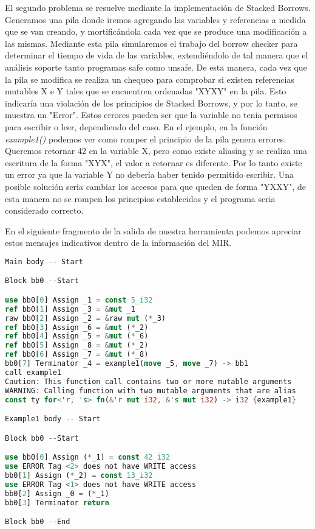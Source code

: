 El segundo problema se resuelve mediante la implementación de Stacked Borrows. Generamos una pila donde iremos agregando las variables y referencias
a medida que se van creando, y mortificándola cada vez que se produce una modificación a las mismas. Mediante esta pila simularemos el trabajo del
borrow checker para determinar el tiempo de vida de las variables, extendiéndolo de tal manera que el análisis soporte tanto programas safe como unsafe.
De esta manera, cada vez que la pila se modifica se realiza un chequeo para comprobar si existen referencias mutables X e Y tales que se encuentren
ordenadas "XYXY" en la pila. Esto indicaría una violación de los principios de Stacked Borrows, y por lo tanto, se muestra un "Error". Estos errores
pueden ser que la variable no tenia permisos para escribir o leer, dependiendo del caso.
En el ejemplo, en la función \textit{example1()} podemos ver como romper el principio de la pila genera errores. Queremos retornar 42 en la variable X,
pero como existe aliasing y se realiza una escritura de la forma "XYX", el valor a retornar es diferente. Por lo tanto existe un error ya que la variable
Y no debería haber tenido permitido escribir. Una posible solución seria cambiar los accesos para que queden de forma "YXXY", de esta manera no se rompen
los principios establecidos y el programa seria considerado correcto.

En el siguiente fragmento de la salida de nuestra herramienta podemos apreciar estos mensajes indicativos dentro de la información del MIR.

\begin{lstlisting}[language=Rust]
Main body -- Start

Block bb0 --Start

use bb0[0] Assign _1 = const 5_i32
ref bb0[1] Assign _3 = &mut _1
raw bb0[2] Assign _2 = &raw mut (*_3)
ref bb0[3] Assign _6 = &mut (*_2)
ref bb0[4] Assign _5 = &mut (*_6)
ref bb0[5] Assign _8 = &mut (*_2)
ref bb0[6] Assign _7 = &mut (*_8)
bb0[7] Terminator _4 = example1(move _5, move _7) -> bb1
call example1
Caution: This function call contains two or more mutable arguments
WARNING: Calling function with two mutable arguments that are alias
const ty for<'r, 's> fn(&'r mut i32, &'s mut i32) -> i32 {example1}

Example1 body -- Start

Block bb0 --Start

use bb0[0] Assign (*_1) = const 42_i32
use ERROR Tag <2> does not have WRITE access
bb0[1] Assign (*_2) = const 13_i32
use ERROR Tag <1> does not have WRITE access
bb0[2] Assign _0 = (*_1)
bb0[3] Terminator return

Block bb0 --End
\end{lstlisting}

